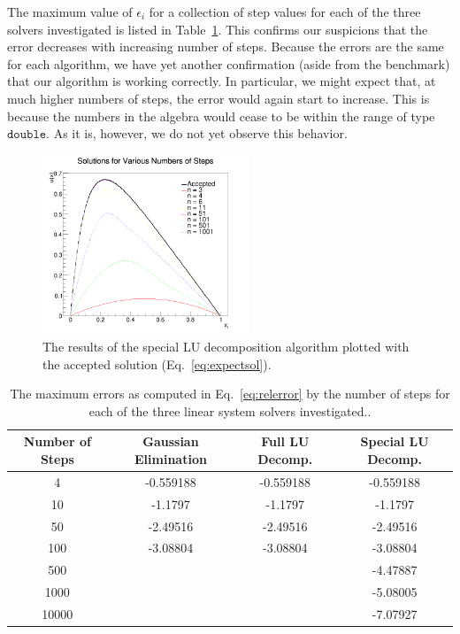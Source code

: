 \documentclass[12pt]{article}
\numberwithin{equation}{section}
\begin{document}
\noindent The maximum value of $\epsilon_{i}$ for a collection of step values for each of the three solvers investigated is listed in Table~\ref{tab:errors}.  This confirms our suspicions that the error decreases with increasing number of steps.  Because the errors are the same for each algorithm, we have yet another confirmation (aside from the benchmark) that our algorithm is working correctly.  In particular, we might expect that, at much higher numbers of steps, the error would again start to increase.  This is because the numbers in the algebra would cease to be within the range of type $\texttt{double}$.  As it is, however, we do not yet observe this behavior.

\begin{figure}[h]
\label{fig:result}
\begin{center}
\includegraphics[width=0.55\textwidth]{plots/solution_plot}
\caption{The results of the special LU decomposition algorithm plotted with the accepted solution (Eq.~\ref{eq:expectsol}).}
\end{center}
\end{figure}

\begin{table}[!h!tbp]
\label{tab:errors}
\begin{center}
\begin{tabular}{c|c|c|c}
\hline
Number of Steps & Gaussian Elimination & Full LU Decomp. & Special LU Decomp. \\
\hline
4 & -0.559188 &-0.559188  & -0.559188 \\
10 & -1.1797 & -1.1797& -1.1797 \\
50 & -2.49516 & -2.49516 & -2.49516 \\
100 & -3.08804 & -3.08804 & -3.08804 \\
500 & & & -4.47887 \\
1000 & & & -5.08005 \\
10000 & & & -7.07927 \\
\hline
\end{tabular}
\caption{The maximum errors as computed in Eq.~\ref{eq:relerror} by the number of steps for each of the three linear system solvers investigated..}
\end{center}
\end{table}
\end{document}
